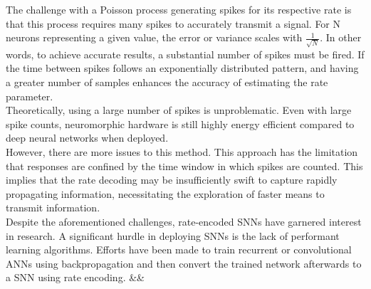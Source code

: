 The challenge with a Poisson process generating spikes for its respective rate is that this process requires many spikes to accurately transmit a signal. For N neurons representing a given value, the error or variance scales with $\frac{1}{\sqrt{N}}$\cite{boerlin_predictive_2013}. In other words, to achieve accurate results, a substantial number of spikes must be fired. If the time between spikes follows an exponentially distributed pattern, and having a greater number of samples enhances the accuracy of estimating the rate parameter.\\
Theoretically, using a large number of spikes is unproblematic. Even with large spike counts, neuromorphic hardware is still highly energy efficient compared to deep neural networks when deployed\cite{indiveri_importance_2019}.\\


However, there are more issues to this method. This approach has the limitation that responses are confined by the time window in which spikes are counted\cite{andrew_spiking_2003}. This implies that the rate decoding may be insufficiently swift to capture rapidly propagating information\cite{guo_neural_2021}, necessitating the exploration of faster means to transmit information.\\
Despite the aforementioned challenges, rate-encoded \acp{SNN} have garnered interest in research. A significant hurdle in deploying \acp{SNN} is the lack of performant learning algorithms. Efforts have been made to train recurrent or convolutional \acp{ANN} using backpropagation and then convert the trained network afterwards to a \ac{SNN}\cite{pfeiffer_deep_2018} using rate encoding\cite{diehl_conversion_2016}\cite{diehl_fast-classifying_2015}.
&&
